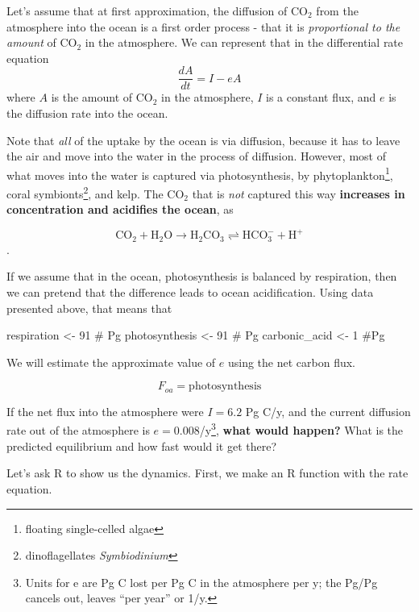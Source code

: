 \documentclass[
  letterpaper,
  DIV=11,
  numbers=noendperiod]{scrreprt}
\newenvironment{Shaded}{\begin{snugshade}}{\end{snugshade}}
\newcommand{\CommentTok}[1]{\textcolor[rgb]{0.37,0.37,0.37}{#1}}
\newcommand{\DecValTok}[1]{\textcolor[rgb]{0.68,0.00,0.00}{#1}}
\newcommand{\NormalTok}[1]{\textcolor[rgb]{0.00,0.23,0.31}{#1}}
\newcommand{\OtherTok}[1]{\textcolor[rgb]{0.00,0.23,0.31}{#1}}
\begin{document}
Let's assume that at first approximation, the diffusion of CO\(_2\) from
the atmosphere into the ocean is a first order process - that it is
\emph{proportional to the amount} of CO\(_2\) in the atmosphere. We can
represent that in the differential rate equation
\[\frac{dA}{dt} = I - eA\] where \(A\) is the amount of CO\(_2\) in the
atmosphere, \(I\) is a constant flux, and \(e\) is the diffusion rate
into the ocean.

Note that \emph{all} of the uptake by the ocean is via diffusion,
because it has to leave the air and move into the water in the process
of diffusion. However, most of what moves into the water is captured via
photosynthesis, by phytoplankton\footnote{floating single-celled algae},
coral symbionts\footnote{dinoflagellates \emph{Symbiodinium}}, and kelp.
The CO\(_2\) that is \emph{not} captured this way \textbf{increases in
concentration and acidifies the ocean}, as

\[\mathrm{CO_2 + H_2O \rightarrow H_2CO_3 \rightleftharpoons HCO_3^- + H^+ }\].

If we assume that in the ocean, photosynthesis is balanced by
respiration, then we can pretend that the difference leads to ocean
acidification. Using data presented above, that means that

\begin{Shaded}
\begin{Highlighting}[]
\NormalTok{respiration }\OtherTok{\textless{}{-}} \DecValTok{91} \CommentTok{\# Pg}
\NormalTok{photosynthesis }\OtherTok{\textless{}{-}} \DecValTok{91} \CommentTok{\# Pg}
\NormalTok{carbonic\_acid }\OtherTok{\textless{}{-}} \DecValTok{1} \CommentTok{\#Pg}
\end{Highlighting}
\end{Shaded}

We will estimate the approximate value of \(e\) using the net carbon
flux.

\[F_{oa} = \mathrm{photosynthesis }\]

If the net flux into the atmosphere were \(I=6.2\) Pg C/y, and the
current diffusion rate out of the atmosphere is
\(e=0.008\)/y\footnote{Units for e are Pg C lost per Pg C in the
  atmosphere per y; the Pg/Pg cancels out, leaves ``per year'' or 1/y.},
\textbf{what would happen?} What is the predicted equilibrium and how
fast would it get there?

Let's ask R to show us the dynamics. First, we make an R function with
the rate equation.
\end{document}
